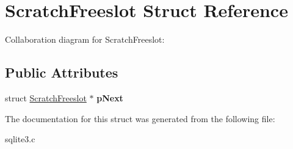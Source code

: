 \hypertarget{structScratchFreeslot}{}\section{Scratch\+Freeslot Struct Reference}
\label{structScratchFreeslot}


Collaboration diagram for Scratch\+Freeslot\+:
\subsection*{Public Attributes}
\begin{DoxyCompactItemize}
\item 
struct \hyperlink{structScratchFreeslot}{Scratch\+Freeslot} $\ast$ {\bfseries p\+Next}\hypertarget{structScratchFreeslot_aca5c55a56a2a63a5be0756707a04bee8}{}\label{structScratchFreeslot_aca5c55a56a2a63a5be0756707a04bee8}

\end{DoxyCompactItemize}


The documentation for this struct was generated from the following file\+:\begin{DoxyCompactItemize}
\item 
sqlite3.\+c\end{DoxyCompactItemize}
